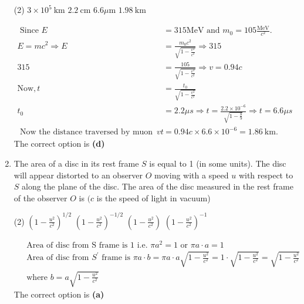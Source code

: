 \begin{enumerate}
\begin{tasks}(2)
	\task[\textbf{A.}] $3 \times 10^{5} \mathrm{~km}$ 
	\task[\textbf{B.}]$2.2 \mathrm{~cm}$
	\task[\textbf{C.}]$6.6 \mu \mathrm{m}$
	\task[\textbf{D.}]$1.98 \mathrm{~km}$
\end{tasks}
\begin{answer}
	\begin{align*}
	\text { Since } E&=315 \mathrm{MeV} \text { and } m_{0}=105 \frac{\mathrm{MeV}}{c^{2}} \text {. }\\
	E=m c^{2} \Rightarrow E&=\frac{m_{0} c^{2}}{\sqrt{1-\frac{v^{2}}{c^{2}}}} \Rightarrow 315	\\
	315&=\frac{105}{\sqrt{1-\frac{v^{2}}{c^{2}}}} \Rightarrow v=0.94 c\\
	\text{Now}, t&=\frac{t_{0}}{\sqrt{1-\frac{v^{2}}{c^{2}}}}\\
	t_{0}&=2.2 \mu s \Rightarrow t=\frac{2.2 \times 10^{-6}}{\sqrt{1-\frac{8}{9}}} \Rightarrow t=6.6 \mu s\\
	\text { Now the distance traversed by muon is } v t&=0.94 c \times 6.6 \times 10^{-6}=1.86 \mathrm{~km} \text {. }
	\end{align*}
	The correct option is \textbf{(d)}
\end{answer}
	\item The area of a disc in its rest frame $S$ is equal to 1 (in some units). The disc will appear distorted to an observer $O$ moving with a speed $u$ with respect to $S$ along the plane of the disc. The area of the disc measured in the rest frame of the observer $O$ is $(c$ is the speed of light in vacuum)
	{}
\begin{tasks}(2)
	\task[\textbf{A.}] $\left(1-\frac{u^{2}}{c^{2}}\right)^{1 / 2}$
	\task[\textbf{B.}]$\left(1-\frac{u^{2}}{c^{2}}\right)^{-1 / 2}$
	\task[\textbf{C.}]$\left(1-\frac{u^{2}}{c^{2}}\right)$
	\task[\textbf{D.}]$\left(1-\frac{u^{2}}{c^{2}}\right)^{-1}$
\end{tasks}
\begin{answer}
\begin{align*}
&\text { Area of disc from } \mathrm{S} \text { frame is } 1 \text { i.e. } \pi a^{2}=1 \text { or } \pi a \cdot a=1\\
&\text { Area of disc from } S^{\prime} \text { frame is } \pi a \cdot b=\pi a \cdot a \sqrt{1-\frac{u^{2}}{c^{2}}}=1 \cdot \sqrt{1-\frac{u^{2}}{c^{2}}}=\sqrt{1-\frac{u^{2}}{c^{2}}}\\
&\text { where } b=a \sqrt{1-\frac{u^{2}}{c^{2}}}
\end{align*}
The correct option is \textbf{(a)}	
\end{answer}


\end{enumerate}
